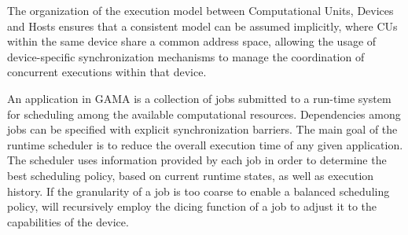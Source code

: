 \documentclass[main.tex]{subfiles}
\begin{document}
The organization of the execution model between Computational Units, Devices and Hosts ensures that a consistent model can be assumed implicitly, where \acsp{CU} within the same device share a common address space, allowing the usage of device-specific synchronization mechanisms to manage the coordination of concurrent executions within that device.

An application in GAMA is a collection of jobs submitted to a run-time system for scheduling among the available computational resources. Dependencies among jobs can be specified with explicit synchronization barriers. The main goal of the runtime scheduler is to reduce the overall execution time of any given application. The scheduler uses information provided by each job in order to determine the best scheduling policy, based on current runtime states, as well as execution history. If the granularity of a job is too coarse to enable a balanced scheduling policy, \gama will recursively employ the dicing function of a job to adjust it to the capabilities of the device.
\end{document}
